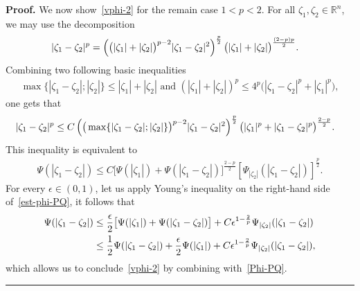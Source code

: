 \documentclass[10pt,a4paper]{amsart}
\newenvironment{proof}[1][Proof]{\textbf{#1.} }{\hfill\rule{0.5em}{0.5em}}
\begin{document}
\begin{proof}
We now show~\eqref{vphi-2} for the remain case $1<p<2$. For all $\zeta_1, \zeta_2 \in \mathbb{R}^n$, we may use the decomposition
\begin{align}\notag
|\zeta_1-\zeta_2|^p & = \left(\big(|\zeta_1|+|\zeta_2|\big)^{p-2} |\zeta_1-\zeta_2|^2\right)^{\frac{p}{2}}  \big(|\zeta_1|+|\zeta_2|\big)^{\frac{(2-p)p}{2}} .
\end{align}
Combining two following basic inequalities 
\begin{align*}
\max\{|\zeta_1-\zeta_2|; |\zeta_2|\} \le |\zeta_1| + |\zeta_2| \mbox{ and } (|\zeta_1|+|\zeta_2|)^p \le 4^p\big(|\zeta_1-\zeta_2|^p + |\zeta_1|^p\big),
\end{align*}
one gets that
\begin{align}\notag
|\zeta_1-\zeta_2|^p & \le C \left(\big(\max\{|\zeta_1-\zeta_2|; |\zeta_2|\}\big)^{p-2} |\zeta_1-\zeta_2|^2\right)^{\frac{p}{2}} \big(|\zeta_1|^p+|\zeta_1-\zeta_2|^p\big)^{\frac{2-p}{2}}.
\end{align}
This inequality is equivalent to
\begin{align}\label{est-phi-PQ}
\Psi(|\zeta_1-\zeta_2|) \le C \big[\Psi(|\zeta_1|) + \Psi(|\zeta_1-\zeta_2|)\big]^{\frac{2-p}{2}} \left[\Psi_{|\zeta_2|}(|\zeta_1-\zeta_2|)\right]^{\frac{p}{2}}.
\end{align}
For every $\epsilon \in (0,1)$, let us apply Young's inequality on the right-hand side of~\eqref{est-phi-PQ}, it follows that
\begin{align}\notag
\Psi(|\zeta_1-\zeta_2|) &\le \frac{\epsilon}{2} \big[\Psi(|\zeta_1|) + \Psi(|\zeta_1-\zeta_2|)\big] + C \epsilon^{1-\frac{2}{p}} \Psi_{|\zeta_2|}(|\zeta_1-\zeta_2|) \\
&\le \frac{1}{2} \Psi(|\zeta_1-\zeta_2|) + \frac{\epsilon}{2} \Psi(|\zeta_1|) + C \epsilon^{1-\frac{2}{p}} \Psi_{|\zeta_2|}(|\zeta_1-\zeta_2|),\notag
\end{align}
which allows us to conclude~\eqref{vphi-2} by combining with~\eqref{Phi-PQ}.
\end{proof}
\end{document}
